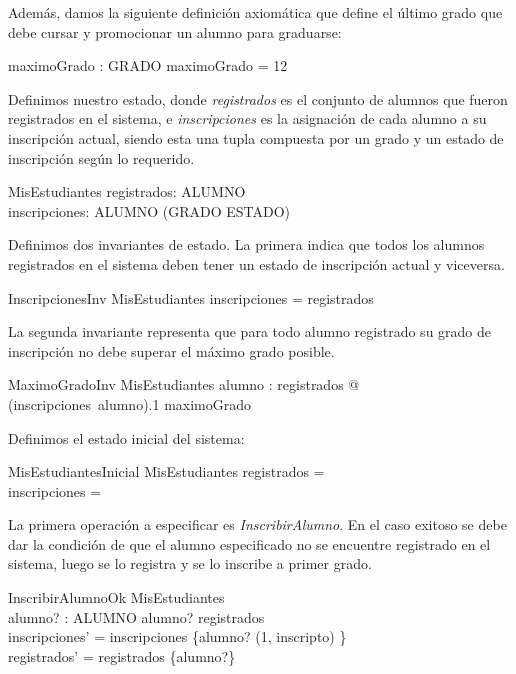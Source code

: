 \documentclass{article}
\begin{document}
Además, damos la siguiente definición axiomática que define el último grado que debe cursar y promocionar un alumno para graduarse:
\begin{axdef}
    maximoGrado : GRADO
\where
    maximoGrado = 12
\end{axdef}

Definimos nuestro estado, donde \emph{registrados} es el conjunto de alumnos que fueron registrados en el sistema, e \emph{inscripciones} es la asignación de cada alumno a su inscripción actual, siendo esta una tupla compuesta por un grado y un estado de inscripción según lo requerido.
\begin{schema}{MisEstudiantes}
  registrados: \power ALUMNO \\
  inscripciones: ALUMNO \pfun (GRADO \cross ESTADO)
\end{schema}

Definimos dos invariantes de estado. La primera indica que todos los alumnos registrados en el sistema deben tener un estado de inscripción actual y viceversa.
\begin{schema}{InscripcionesInv}
  MisEstudiantes
  \where
  \dom inscripciones = registrados
\end{schema}

La segunda invariante representa que para todo alumno registrado su grado de inscripción no debe superar el máximo grado posible.
\begin{schema}{MaximoGradoInv}
    MisEstudiantes
    \where
    \forall alumno : registrados @ (inscripciones~alumno).1 \leq maximoGrado
\end{schema}

Definimos el estado inicial del sistema:
\begin{schema}{MisEstudiantesInicial}
    MisEstudiantes
    \where
    registrados = \emptyset \\
    inscripciones = \emptyset
\end{schema}

La primera operación a especificar es \emph{InscribirAlumno}. En el caso exitoso se debe dar la condición de que el alumno especificado no se encuentre registrado en el sistema, luego se lo registra y se lo inscribe a primer grado.
\begin{schema}{InscribirAlumnoOk}
    \Delta MisEstudiantes \\
    alumno? : ALUMNO
    \where
    alumno? \notin registrados \\
    inscripciones' = inscripciones \cup \{alumno? \mapsto (1, inscripto) \} \\
    registrados' = registrados \cup \{alumno?\}
\end{schema}
\end{document}
